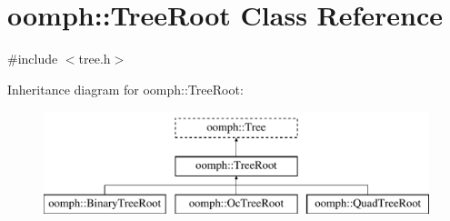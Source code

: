 \hypertarget{classoomph_1_1TreeRoot}{}\section{oomph\+:\+:Tree\+Root Class Reference}
\label{classoomph_1_1TreeRoot}


{\ttfamily \#include $<$tree.\+h$>$}

Inheritance diagram for oomph\+:\+:Tree\+Root\+:\begin{figure}[H]
\begin{center}
\leavevmode
\includegraphics[height=3.000000cm]{classoomph_1_1TreeRoot}
\end{center}
\end{figure}
